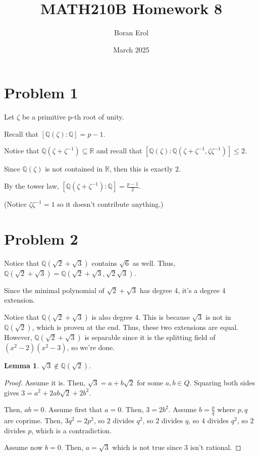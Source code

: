 \documentclass{article}
\title{MATH210B Homework 8}
\date{March 2025}
\author{Boran Erol}
\theoremstyle{definition}
\newtheorem{lemma}[theorem]{Lemma}
\begin{document}
\maketitle

\section{Problem 1}

Let $ \zeta $ be a primitive p-th root of unity.

Recall that $ [\mathbb{Q}(\zeta): \mathbb{Q} ] = p - 1 $.

Notice that $ \mathbb{Q}(\zeta + \zeta^{-1}) \subseteq \mathbb{R} $ and recall that 
$ [\mathbb{Q}(\zeta): \mathbb{Q}(\zeta + \zeta^{-1}, \zeta \zeta^{-1}) ] \leq 2 $.

Since $ \mathbb{Q}(\zeta) $ is not contained in $ \mathbb{R} $, then this is exactly $ 2 $.

By the tower law, $ [\mathbb{Q}(\zeta + \zeta^{-1}) : \mathbb{Q} ] = \frac{p - 1}{2} $.

(Notice $ \zeta \zeta^{-1} = 1 $ so it doesn't contribute anything.)


\section{Problem 2}

Notice that $ \mathbb{Q}(\sqrt{2} + \sqrt{3}) $ contains $ \sqrt{6} $ as well.
Thus, $ \mathbb{Q}(\sqrt{2} + \sqrt{3}) =  \mathbb{Q}(\sqrt{2} + \sqrt{3}, \sqrt{2}\sqrt{3}) $.

Since the minimal polynomial of $ \sqrt{2} + \sqrt{3} $ has degree 4, it's a degree 4 extension.

Notice that $ \mathbb{Q}(\sqrt{2} + \sqrt{3}) $ is also degree 4. This is because $ \sqrt{3} $ is not
in $ \mathbb{Q}(\sqrt{2}) $, which is proven at the end. Thus, these two extensions are equal.
However, $ \mathbb{Q}(\sqrt{2} + \sqrt{3}) $ is separable since it is the splitting field of $ (x^{2} - 2)(x^{2} - 3) $,
so we're done.

\begin{lemma}
    $ \sqrt{3} \notin \mathbb{Q}(\sqrt{2}) $.
\end{lemma}
\begin{proof}
    Assume it is. Then, $ \sqrt{3} = a + b \sqrt{2} $ for some $ a,b \in Q $.
    Squaring both sides gives $ 3 = a^{2} + 2ab \sqrt{2} + 2b^{2} $.

    Then, $ ab = 0 $. Assume first that $ a = 0 $. Then, $ 3 = 2b^{2} $.
    Assume $ b = \frac{p}{q} $ where $ p,q $ are coprime. Then, $ 3q^{2} = 2p^{2} $,
    so $ 2 $ divides $ q^{2} $, so $ 2 $ divides $ q $, so $ 4 $ divides $ q^{2} $,
    so $ 2 $ divides $ p $, which is a contradiction.

    Assume now $ b = 0 $. Then, $ a = \sqrt{3} $ which is not true since $ 3 $ isn't rational.
\end{proof}
\end{document}
